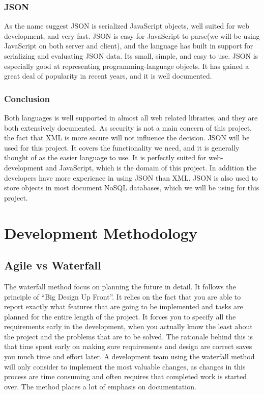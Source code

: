 \subsubsection{JSON}
As the name suggest JSON is serialized JavaScript objects, well suited for web development, and very fast. JSON is easy for JavaScript to parse(we will be using JavaScript on both server and client), and the language has built in support for serializing and evaluating JSON data. Its small, simple, and easy to use. JSON is especially good at representing programming-language objects. It has gained a great deal of popularity in recent years, and it is well documented.

\subsubsection{Conclusion}
Both languages is well supported in almost all web related libraries, and they are both extensively documented. As security is not a main concern of this project, the fact that XML is more secure will not influence the decision. JSON will be used for this project. It covers the functionality we need, and it is generally thought of as the easier language to use. It is perfectly suited for web- development and JavaScript, which is the domain of this project. In addition the developers have more experience in using JSON than XML. JSON is also used to store objects in most document NoSQL databases, which we will be using for this project.

\section{Development Methodology}
\subsection{Agile vs Waterfall}
The waterfall method focus on planning the future in detail. It follows the principle of “Big Design Up Front”. It relies on the fact that you are able to report exactly what features that are going to be implemented and tasks are planned for the entire length of the project. It forces you to specify all the requirements early in the development, when you actually know the least about the project and the problems that are to be solved. The rationale behind this is that time spent early on making sure requirements and design are correct saves you much time and effort later. A development team using the waterfall method will only consider to implement the most valuable changes, as changes in this process are time consuming and often requires that completed work is started over. The method places a lot of emphasis on documentation.

